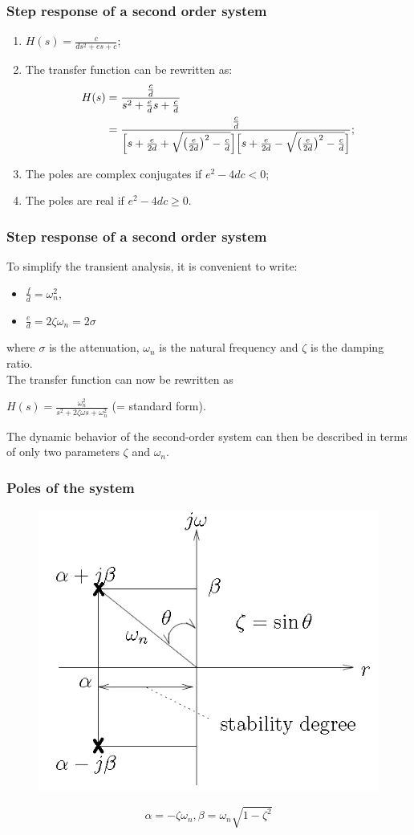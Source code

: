 \begin{frame}
\frametitle{Step response of a second order system}
\begin{enumerate}
\item $H(s) = \frac{c}{ds^2+es+c}$;
\item The transfer function can be rewritten as:
\begin{align*}
H(s) &= \frac{\frac{c}{d}}{s^2+\frac{e}{d}s+\frac{c}{d}}
\vspace{-0.1cm}\\ &= \frac{\frac{c}{d}}{\Big[s+\frac{e}{2d}+\sqrt{\big(\frac{e}{2d}\big)^2-\frac{c}{d}}\Big]\Big[s+\frac{e}{2d}-\sqrt{\big(\frac{e}{2d}\big)^2-\frac{c}{d}}\Big]};
\end{align*}
\item The poles are complex conjugates if $e^2 -4dc <0$;
\item The poles are real if $e^2 -4dc\ge 0$.
\end{enumerate}
\end{frame}

\begin{frame}
\frametitle{Step response of a second order system}

To simplify the transient analysis, it is convenient to write:
\begin{itemize}
\item $\frac{f}{d} = \omega_n ^2\text{, }$
\item $\frac{e}{d}=2\zeta\omega_n=2\sigma$
\end{itemize}
where $\sigma$ is the attenuation, $\omega_n$ is the natural frequency and $\zeta$ is the damping ratio.\\
\vspace{0.5em}
The transfer function can now be rewritten as\\
\begin{center}
$H(s) = \frac{\omega_n ^2}{s^2+2\zeta\omega s +\omega_n ^2}$ (= standard form).\\
\end{center}
The dynamic behavior of the second-order system can then be described in terms of only two parameters $\zeta$ and $\omega_n$.
\end{frame}

\begin{frame}
\frametitle{Poles of the system}
\begin{figure}
\includegraphics[width=0.5\linewidth]{poles_system}
\end{figure}
$$\alpha=-\zeta\omega_n, \beta=\omega_n\sqrt{1-\zeta^2}$$
\end{frame}

